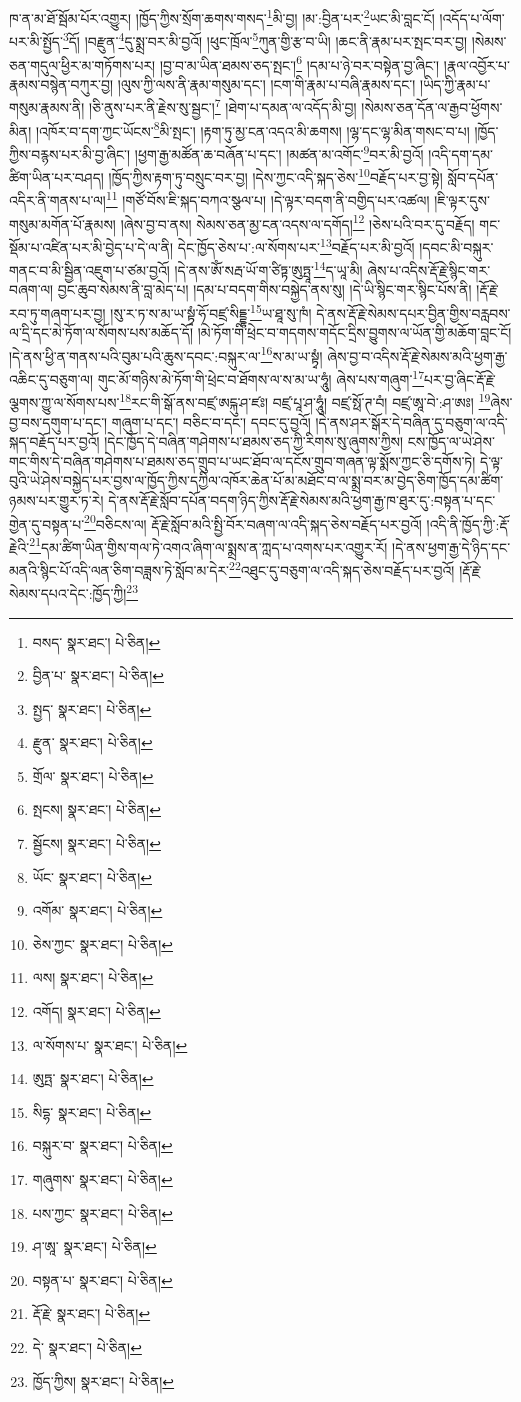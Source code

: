 ཁ་ན་མ་ཐོ་སྦོམ་པོར་འགྱུར། །ཁྱོད་ཀྱིས་སྲོག་ཆགས་གསད་\footnote{བསད་  སྣར་ཐང་།  པེ་ཅིན། }མི་བྱ། །མ་:བྱིན་པར་\footnote{བྱིན་པ་  སྣར་ཐང་།  པེ་ཅིན། }ཡང་མི་བླང་ངོ། །འདོད་པ་ལོག་པར་མི་སྤྱོད་\footnote{སྤྱད་  སྣར་ཐང་།  པེ་ཅིན། }དོ། །བརྫུན་\footnote{རྫུན་  སྣར་ཐང་།  པེ་ཅིན། }དུ་སྨྲ་བར་མི་བྱའོ། །ཕུང་ཁྲོལ་\footnote{གྲོལ་  སྣར་ཐང་།  པེ་ཅིན། }ཀུན་གྱི་རྩ་བ་ཡི། །ཆང་ནི་རྣམ་པར་སྤང་བར་བྱ། །སེམས་ཅན་གདུལ་ཕྱིར་མ་གཏོགས་པར། །བྱ་བ་མ་ཡིན་ཐམས་ཅད་སྤང་།\footnote{སྤངས།  སྣར་ཐང་།  པེ་ཅིན། } །དམ་པ་ཉེ་བར་བསྟེན་བྱ་ཞིང་། །རྣལ་འབྱོར་པ་རྣམས་བསྙེན་བཀུར་བྱ། །ལུས་ཀྱི་ལས་ནི་རྣམ་གསུམ་དང་། །ངག་གི་རྣམ་པ་བཞི་རྣམས་དང་། །ཡིད་ཀྱི་རྣམ་པ་གསུམ་རྣམས་ནི། །ཅི་ནུས་པར་ནི་རྗེས་སུ་སྦྱང་།\footnote{སྦྱོངས།  སྣར་ཐང་།  པེ་ཅིན། } །ཐེག་པ་དམན་ལ་འདོད་མི་བྱ། །སེམས་ཅན་དོན་ལ་རྒྱབ་ཕྱོགས་མིན། །འཁོར་བ་དག་ཀྱང་ཡོངས་\footnote{ཡོང་  སྣར་ཐང་།  པེ་ཅིན། }མི་སྤང་། །རྟག་ཏུ་མྱ་ངན་འདའ་མི་ཆགས། །ལྷ་དང་ལྷ་མིན་གསང་བ་པ། །ཁྱོད་ཀྱིས་བརྙས་པར་མི་བྱ་ཞིང་། །ཕྱག་རྒྱ་མཚོན་ཆ་བཞོན་པ་དང་། །མཚན་མ་འགོང་\footnote{འགོམ་  སྣར་ཐང་།  པེ་ཅིན། }བར་མི་བྱའོ། །འདི་དག་དམ་ཚིག་ཡིན་པར་བཤད། །ཁྱོད་ཀྱིས་རྟག་ཏུ་བསྲུང་བར་བྱ། །དེས་ཀྱང་འདི་སྐད་ཅེས་\footnote{ཅེས་ཀྱང་  སྣར་ཐང་།  པེ་ཅིན། }བརྗོད་པར་བྱ་སྟེ། སློབ་དཔོན་འདིར་ནི་གནས་པ་ལ།\footnote{ལས།  སྣར་ཐང་།  པེ་ཅིན། } །གཙོ་བོས་ཇི་སྐད་བཀའ་སྩལ་པ། །དེ་ལྟར་བདག་ནི་བགྱིད་པར་འཚལ། །ཇི་ལྟར་དུས་གསུམ་མགོན་པོ་རྣམས། །ཞེས་བྱ་བ་ནས། སེམས་ཅན་མྱ་ངན་འདས་ལ་དགོད།\footnote{འགོད།  སྣར་ཐང་།  པེ་ཅིན། } །ཅེས་པའི་བར་དུ་བརྗོད། གང་སྡོམ་པ་འཛིན་པར་མི་བྱེད་པ་དེ་ལ་ནི། དེང་ཁྱོད་ཅེས་པ་:ལ་སོགས་པར་\footnote{ལ་སོགས་པ་  སྣར་ཐང་།  པེ་ཅིན། }བརྗོད་པར་མི་བྱའོ། །དབང་མི་བསྐུར་གནང་བ་མི་སྦྱིན་འཇུག་པ་ཙམ་བྱའོ། །དེ་ནས་ཨོཾ་སརྦ་ཡོ་ག་ཙིཏྟ་ཨུཏྤཱ་\footnote{ཨུཏྤ་  སྣར་ཐང་།  པེ་ཅིན། }ད་ཡཱ་མི། ཞེས་པ་འདིས་རྡོ་རྗེ་སྙིང་གར་བཞག་ལ། བྱང་ཆུབ་སེམས་ནི་བླ་མེད་པ། །དམ་པ་བདག་གིས་བསྐྱེད་ནས་སུ། །དེ་ཡི་སྙིང་གར་སྙིང་པོས་ནི། །རྡོ་རྗེ་རབ་ཏུ་གཞག་པར་བྱ། །སུ་ར་ཏ་ས་མ་ཡ་སྟྭཾ་ཧོ་བཛྲ་སིདྡྷ་\footnote{སིདྷ་  སྣར་ཐང་།  པེ་ཅིན། }ཡ་ཐཱ་སུ་ཁཾ། དེ་ནས་རྡོ་རྗེ་སེམས་དཔར་བྱིན་གྱིས་བརླབས་ལ་དྲི་དང་མེ་ཏོག་ལ་སོགས་པས་མཆོད་དོ། །མེ་ཏོག་གི་ཕྲེང་བ་གདགས་གདོང་དྲིས་བྱུགས་ལ་ཡོན་གྱི་མཆོག་བླང་ངོ། །དེ་ནས་ཕྱི་ན་གནས་པའི་བུམ་པའི་ཆུས་དབང་:བསྐུར་ལ་\footnote{བསྐུར་བ་  སྣར་ཐང་།  པེ་ཅིན། }ས་མ་ཡ་སྟྭཾ། ཞེས་བྱ་བ་འདིས་རྡོ་རྗེ་སེམས་མའི་ཕྱག་རྒྱ་འཆིང་དུ་བཅུག་ལ། གུང་མོ་གཉིས་མེ་ཏོག་གི་ཕྲེང་བ་ཐོགས་ལ་ས་མ་ཡ་ཧཱུཾ། ཞེས་པས་གཞུག་\footnote{གཞུགས་  སྣར་ཐང་།  པེ་ཅིན། }པར་བྱ་ཞིང་རྡོ་རྗེ་ལྕགས་ཀྱུ་ལ་སོགས་པས་\footnote{པས་ཀྱང་  སྣར་ཐང་།  པེ་ཅིན། }རང་གི་སྒོ་ནས་བཛྲ་ཨངྐུ་ཤ་ཛཿ། བཛྲ་པཱ་ཤ་ཧཱུཾ། བཛྲ་སྥོ་ཊ་བཾ། བཛྲ་ཨཱ་བེ་:ཤ་ཨཿ། \footnote{ཤ་ཨཱ་  སྣར་ཐང་།  པེ་ཅིན། }ཞེས་བྱ་བས་དགུག་པ་དང་། གཞུག་པ་དང་། བཅིང་བ་དང་། དབང་དུ་བྱའོ། །དེ་ནས་ཤར་སྒོར་དེ་བཞིན་དུ་བཅུག་ལ་འདི་སྐད་བརྗོད་པར་བྱའོ། །དེང་ཁྱོད་དེ་བཞིན་གཤེགས་པ་ཐམས་ཅད་ཀྱི་རིགས་སུ་ཞུགས་ཀྱིས། ངས་ཁྱོད་ལ་ཡེ་ཤེས་གང་གིས་དེ་བཞིན་གཤེགས་པ་ཐམས་ཅད་གྲུབ་པ་ཡང་ཐོབ་ལ་དངོས་གྲུབ་གཞན་ལྟ་སྨོས་ཀྱང་ཅི་དགོས་ཏེ། དེ་ལྟ་བུའི་ཡེ་ཤེས་བསྐྱེད་པར་བྱས་ལ་ཁྱོད་ཀྱིས་དཀྱིལ་འཁོར་ཆེན་པོ་མ་མཐོང་བ་ལ་སྨྲ་བར་མ་བྱེད་ཅིག་ཁྱོད་དམ་ཚིག་ཉམས་པར་གྱུར་ཏ་རེ། དེ་ནས་རྡོ་རྗེ་སློབ་དཔོན་བདག་ཉིད་ཀྱིས་རྡོ་རྗེ་སེམས་མའི་ཕྱག་རྒྱ་ཁ་ཐུར་དུ་:བསྟན་པ་དང་གྱེན་དུ་བསྟན་པ་\footnote{བསྟན་པ་  སྣར་ཐང་།  པེ་ཅིན། }བཅིངས་ལ། རྡོ་རྗེ་སློབ་མའི་སྤྱི་བོར་བཞག་ལ་འདི་སྐད་ཅེས་བརྗོད་པར་བྱའོ། །འདི་ནི་ཁྱོད་ཀྱི་:རྡོ་རྗེའི་\footnote{རྡོ་རྗེ་  སྣར་ཐང་།  པེ་ཅིན། }དམ་ཚིག་ཡིན་གྱིས་གལ་ཏེ་འགའ་ཞིག་ལ་སྨྲས་ན་ཀླད་པ་འགས་པར་འགྱུར་རོ། །དེ་ནས་ཕྱག་རྒྱ་དེ་ཉིད་དང་མནའི་སྙིང་པོ་འདི་ལན་ཅིག་བཟླས་ཏེ་སློབ་མ་དེར་\footnote{དེ་  སྣར་ཐང་།  པེ་ཅིན། }འཐུང་དུ་བཅུག་ལ་འདི་སྐད་ཅེས་བརྗོད་པར་བྱའོ། །རྡོ་རྗེ་སེམས་དཔའ་དེང་:ཁྱོད་ཀྱི།\footnote{ཁྱོད་ཀྱིས།  སྣར་ཐང་།  པེ་ཅིན། } 